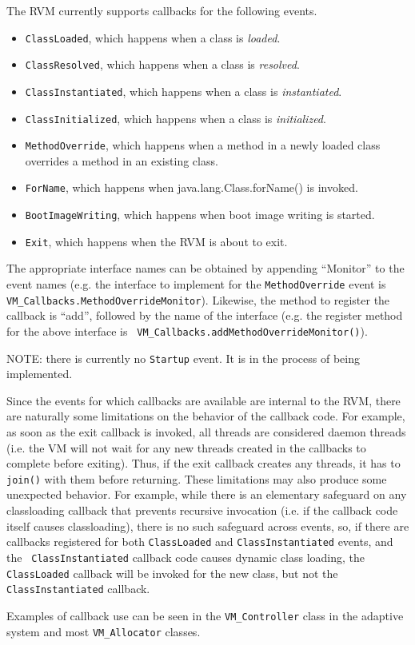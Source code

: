 The RVM currently supports callbacks for the following events.
\begin{itemize}
\item {\tt ClassLoaded}, which happens when a class is {\em loaded}.
\item {\tt ClassResolved}, which happens when a class is {\em resolved}.
\item {\tt ClassInstantiated}, which happens when a class is {\em
instantiated}.
\item {\tt ClassInitialized}, which happens when a class is {\em initialized}.
\item {\tt MethodOverride}, which happens when a method in a newly loaded class
overrides a method in an existing class.
\item {\tt ForName}, which happens when java.lang.Class.forName() is invoked.
\item {\tt BootImageWriting}, which happens when boot image writing is started.
\item {\tt Exit}, which happens when the RVM is about to exit.
\end{itemize}
The appropriate interface names can be obtained by appending ``Monitor'' to the
event names (e.g. the interface to implement for the {\tt MethodOverride} event
is {\tt VM\_Callbacks.MethodOverrideMonitor}).  Likewise, the method to
register the callback is ``add'', followed by the name of the interface (e.g.
the register method for the above interface is {\tt
VM\_Callbacks.addMethodOverrideMonitor()}).

NOTE: there is currently no {\tt Startup} event.  It is in the process of being
implemented.

Since the events for which callbacks are available are internal to the RVM,
there are naturally some limitations on the behavior of the callback code.  For
example, as soon as the exit callback is invoked, all threads are considered
daemon threads (i.e. the VM will not wait for any new threads created in the
callbacks to complete before exiting).  Thus, if the exit callback creates any
threads, it has to {\tt join()} with them before returning.  These limitations
may also produce some unexpected behavior.  For example, while there is an
elementary safeguard on any classloading callback that prevents recursive
invocation (i.e. if the callback code itself causes classloading), there is no
such safeguard across events, so, if there are callbacks registered for both
{\tt ClassLoaded} and {\tt ClassInstantiated} events, and the {\tt
ClassInstantiated} callback code causes dynamic class loading, the {\tt
ClassLoaded} callback will be invoked for the new class, but not the {\tt
ClassInstantiated} callback.

Examples of callback use can be seen in the {\tt VM\_Controller} class in the
adaptive system and most {\tt VM\_Allocator} classes.


